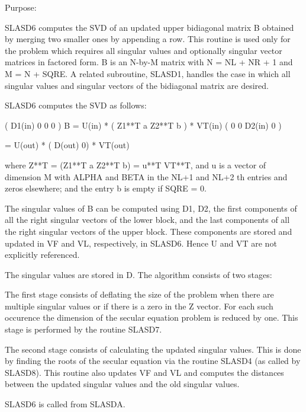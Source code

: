  \begin{DoxyParagraph}{Purpose\+: }
\begin{DoxyVerb} SLASD6 computes the SVD of an updated upper bidiagonal matrix B
 obtained by merging two smaller ones by appending a row. This
 routine is used only for the problem which requires all singular
 values and optionally singular vector matrices in factored form.
 B is an N-by-M matrix with N = NL + NR + 1 and M = N + SQRE.
 A related subroutine, SLASD1, handles the case in which all singular
 values and singular vectors of the bidiagonal matrix are desired.

 SLASD6 computes the SVD as follows:

               ( D1(in)    0    0       0 )
   B = U(in) * (   Z1**T   a   Z2**T    b ) * VT(in)
               (   0       0   D2(in)   0 )

     = U(out) * ( D(out) 0) * VT(out)

 where Z**T = (Z1**T a Z2**T b) = u**T VT**T, and u is a vector of dimension M
 with ALPHA and BETA in the NL+1 and NL+2 th entries and zeros
 elsewhere; and the entry b is empty if SQRE = 0.

 The singular values of B can be computed using D1, D2, the first
 components of all the right singular vectors of the lower block, and
 the last components of all the right singular vectors of the upper
 block. These components are stored and updated in VF and VL,
 respectively, in SLASD6. Hence U and VT are not explicitly
 referenced.

 The singular values are stored in D. The algorithm consists of two
 stages:

       The first stage consists of deflating the size of the problem
       when there are multiple singular values or if there is a zero
       in the Z vector. For each such occurence the dimension of the
       secular equation problem is reduced by one. This stage is
       performed by the routine SLASD7.

       The second stage consists of calculating the updated
       singular values. This is done by finding the roots of the
       secular equation via the routine SLASD4 (as called by SLASD8).
       This routine also updates VF and VL and computes the distances
       between the updated singular values and the old singular
       values.

 SLASD6 is called from SLASDA.\end{DoxyVerb}
 
\end{DoxyParagraph}

